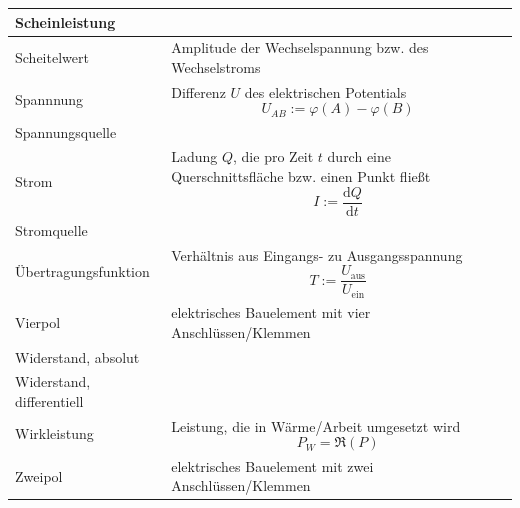 \documentclass{article}
\newcommand{\diff}{\mathrm{d}}
\begin{document}
\begin{xltabular}{\linewidth}{p{6cm}|X}
	\hline
		Scheinleistung &  \\
	\hline
		Scheitelwert & Amplitude der Wechselspannung bzw. des Wechselstroms \\
	\hline
		Spannnung & Differenz $U$ des elektrischen Potentials
			$$U_{AB} := \varphi(A) - \varphi(B)$$ \\
	\hline
		Spannungsquelle &  \\
	\hline
		Strom & Ladung $Q$, die pro Zeit $t$ durch eine Querschnittsfläche bzw. einen Punkt fließt
			$$I := \frac{\diff Q}{\diff t}$$ \\
	\hline
		Stromquelle &  \\
	\hline
		Übertragungsfunktion & Verhältnis aus Eingangs- zu Ausgangsspannung
			$$T := \frac{U_\text{aus}}{U_\text{ein}}$$ \\
	\hline
		Vierpol & elektrisches Bauelement mit vier Anschlüssen/Klemmen \\
	\hline
		Widerstand, absolut &  \\
	\hline
		Widerstand, differentiell &  \\
	\hline
		Wirkleistung & Leistung, die in Wärme/Arbeit umgesetzt wird
			$$P_W = \Re(P)$$ \\
	\hline
		Zweipol & elektrisches Bauelement mit zwei Anschlüssen/Klemmen \\
	\hline\hline
\end{xltabular}
\end{document}
